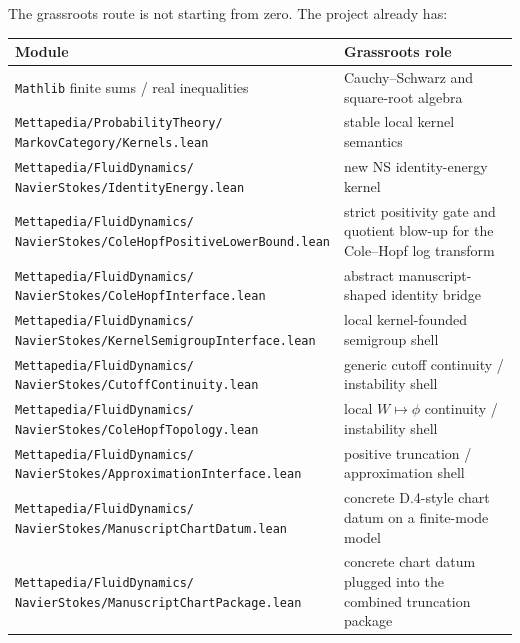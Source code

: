 \documentclass[11pt]{article}
\theoremstyle{remark}
\begin{document}
The grassroots route is not starting from zero.  The project already has:
\begin{center}
\begin{tabular}{p{}p{}}
\toprule
\textbf{Module} & \textbf{Grassroots role} \\
\midrule
\texttt{Mathlib} finite sums / real inequalities & Cauchy--Schwarz and square-root algebra \\
\shortstack[l]{\texttt{Mettapedia/ProbabilityTheory/}\\\texttt{MarkovCategory/Kernels.lean}} & stable local kernel semantics \\
\shortstack[l]{\texttt{Mettapedia/FluidDynamics/}\\\texttt{NavierStokes/IdentityEnergy.lean}} & new NS identity-energy kernel \\
\shortstack[l]{\texttt{Mettapedia/FluidDynamics/}\\\texttt{NavierStokes/ColeHopfPositiveLowerBound.lean}} & strict positivity gate and quotient blow-up for the Cole--Hopf log transform \\
\shortstack[l]{\texttt{Mettapedia/FluidDynamics/}\\\texttt{NavierStokes/ColeHopfInterface.lean}} & abstract manuscript-shaped identity bridge \\
\shortstack[l]{\texttt{Mettapedia/FluidDynamics/}\\\texttt{NavierStokes/KernelSemigroupInterface.lean}} & local kernel-founded semigroup shell \\
\shortstack[l]{\texttt{Mettapedia/FluidDynamics/}\\\texttt{NavierStokes/CutoffContinuity.lean}} & generic cutoff continuity / instability shell \\
\shortstack[l]{\texttt{Mettapedia/FluidDynamics/}\\\texttt{NavierStokes/ColeHopfTopology.lean}} & local \(W \mapsto \phi\) continuity / instability shell \\
\shortstack[l]{\texttt{Mettapedia/FluidDynamics/}\\\texttt{NavierStokes/ApproximationInterface.lean}} & positive truncation / approximation shell \\
\shortstack[l]{\texttt{Mettapedia/FluidDynamics/}\\\texttt{NavierStokes/ManuscriptChartDatum.lean}} & concrete D.4-style chart datum on a finite-mode model \\
\shortstack[l]{\texttt{Mettapedia/FluidDynamics/}\\\texttt{NavierStokes/ManuscriptChartPackage.lean}} & concrete chart datum plugged into the combined truncation package \\

\end{tabular}
\end{center}
\end{document}
